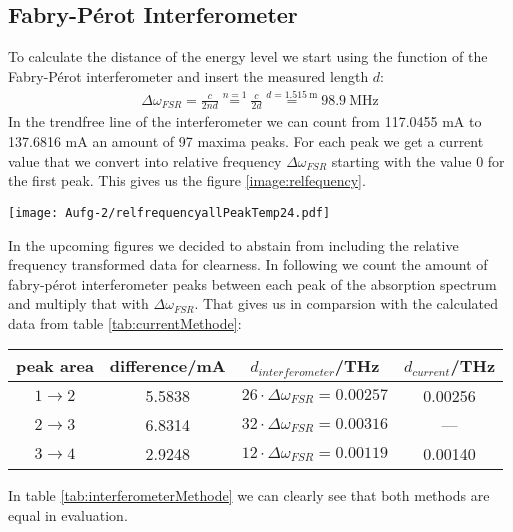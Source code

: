 \subsection*{Fabry-Pérot Interferometer}
To calculate the distance of the energy level we start using the function of the Fabry-Pérot interferometer and insert the measured length $d$:
\begin{gather}
    \Delta\omega_{FSR} = \frac{c}{2nd} \overset{n=1}{=} \frac{c}{2d} \overset{d=\SI{1.515}{\metre}}{=} \SI{98.9}{\mega\hertz} 
\end{gather}
In the trendfree line of the interferometer we can count from 117.0455 mA to 137.6816 mA an amount of 97 maxima peaks. For each peak we get a current value that we convert into relative frequency $\Delta\omega_{FSR}$ starting with the value 0 for the first peak. This gives us the figure \ref{image:relfequency}.
\begin{center}
    \texttt{[image: Aufg-2/relfrequencyallPeakTemp24.pdf]}
    \label{image:relfequency}
\end{center}
In the upcoming figures we decided to abstain from including the relative frequency transformed data for clearness. 
\newpage
In following we count the amount of fabry-pérot interferometer peaks between each peak of the absorption spectrum and multiply that with $\Delta\omega_{FSR}$. That gives us in comparsion with the calculated data from table \ref{tab:currentMethode}:
\begin{center}
    \begin{tabular}{c | c c c}
        peak area & difference/mA & $d_{interferometer}$/THz & $d_{current}$/THz\\
        \hline
        $1 \rightarrow 2$ & 5.5838 & $26\cdot\Delta\omega_{FSR} = 0.00257$ & 0.00256\\
        $2 \rightarrow 3$ & 6.8314 & $32\cdot\Delta\omega_{FSR} = 0.00316$ &   ---  \\
        $3 \rightarrow 4$ & 2.9248 & $12\cdot\Delta\omega_{FSR} = 0.00119$ & 0.00140\\
    \end{tabular}
    \label{tab:interferometerMethode}
\end{center} 
In table \ref{tab:interferometerMethode} we can clearly see that both methods are equal in evaluation.
\newpage

